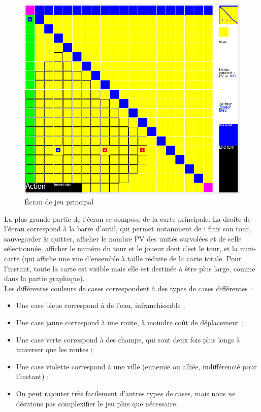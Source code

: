 \documentclass[11pt,a4paper]{article}
\begin{document}
\begin{figure}[h]
\begin{center}
\includegraphics[scale=0.5]{./ecran_de_gestion.png}
\caption{Écran de jeu principal\label{fig2}}

\end{center}
\end{figure}

La plus grande partie de l'écran se compose de la carte principale. La droite de l'écran correspond à la barre d'outil, qui permet notamment de : finir son tour, sauvegarder \& quitter, afficher le nombre PV des unités survolées et de celle sélectionnée, afficher le numéro du tour et le joueur dont c'est le tour, et la mini-carte (qui affiche une vue d'ensemble à taille réduite de la carte totale. Pour l'instant, toute la carte est visible mais elle est destinée à être plus large, comme dans la partie graphique). \\

Les différentes couleurs de cases correspondent à des types de cases différentes : \\
\begin{itemize}
\item Une case bleue correspond à de l'eau, infranchissable ;
\item Une case jaune correspond à une route, à moindre coût de déplacement ;
\item Une case verte correspond à des champs, qui sont deux fois plus longs à traverser que les routes ;\
\item Une case violette correspond à une ville (ennemie ou alliée, indifférencié pour l'instant) ;
\item On peut rajouter très facilement d'autres types de cases, mais nous ne désirions pas complexifier le jeu plus que nécessaire.
\end{itemize}
\end{document}
